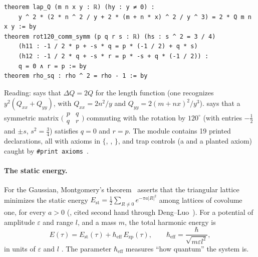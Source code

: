 \begin{leanbox}
\begin{lstlisting}[style=chIIIlean]
theorem lap_Q (m n x y : ℝ) (hy : y ≠ 0) :
    y ^ 2 * (2 * n ^ 2 / y + 2 * (m + n * x) ^ 2 / y ^ 3) = 2 * Q m n x y := by
theorem rot120_comm_symm (p q r s : ℝ) (hs : s ^ 2 = 3 / 4)
    (h11 : -1 / 2 * p + -s * q = p * (-1 / 2) + q * s)
    (h12 : -1 / 2 * q + -s * r = p * -s + q * (-1 / 2)) :
    q = 0 ∧ r = p := by
theorem rho_sq : rho ^ 2 = rho - 1 := by
\end{lstlisting}
\end{leanbox}
\noindent Reading:  says that $\Delta Q=2Q$ for the length function (one recognizes
$y^2(Q_{xx}+Q_{yy})$, with $Q_{xx}=2n^2/y$ and $Q_{yy}=2(m+nx)^2/y^3$).  says that a symmetric
matrix $\bigl(\begin{smallmatrix}p&q\\q&r\end{smallmatrix}\bigr)$ commuting with the rotation by $120^\circ$
(with entries $-\tfrac12$ and $\pm s$, $s^2=\tfrac34$) satisfies $q=0$ and $r=p$. The module contains 19 printed
declarations, all with axioms in $\{$, , $\}$, and trap
controls (a  and a planted axiom) caught by \texttt{\#print axioms}~\cite{ch3-p2zp}. \tierAs

\paragraph{The static energy.} For the Gaussian, Montgomery's theorem~\cite{montgomery} asserts that the triangular
lattice minimizes the static energy $E_{\mathrm{st}}=\tfrac12\sum_{R\ne0}e^{-\pi a|R|^2}$ among lattices of
covolume one, for every $a>0$ (\tierL, cited second hand through Deng--Luo~\cite{ch3-dengluo}). For a potential
of amplitude $\varepsilon$ and range $l$, and a mass $m$, the total harmonic energy is
\begin{equation}\label{ch3:eq:total}
E(\tau)=E_{\mathrm{st}}(\tau)+\hbar_{\mathrm{eff}}\,E_{\mathrm{zp}}(\tau),\qquad\hbar_{\mathrm{eff}}=\frac{\hbar}{\sqrt{m\varepsilon l^2}} ,
\end{equation}
in units of $\varepsilon$ and $l$ \tierC. The parameter $\hbar_{\mathrm{eff}}$ measures ``how quantum'' the system
is.

